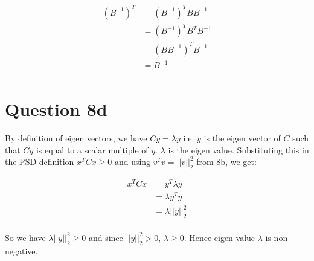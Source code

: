 \documentclass{article}
\begin{document}
    \begin{align*}
        (B^{-1})^T  &= (B^{-1})^TBB^{-1} \\
                    &= (B^{-1})^TB^TB^{-1} \\
                    &= (BB^{-1})^TB^{-1} \\
                    &= B^{-1} \\
    \end{align*}

    \section*{Question 8d}
    By definition of eigen vectors, we have $Cy = \lambda y$ i.e. $y$ is the eigen vector of $C$ such that $Cy$ is equal to a scalar multiple of $y$. $\lambda$ is the eigen value. Substituting this in the PSD definition $x^TCx \ge 0$ and using $v^Tv = ||v||_2^2$ from 8b, we get:

    \begin{align*}
        x^TCx   &= y^T\lambda y \\
                &= \lambda y^Ty \\
                &= \lambda ||y||_2^2 \\
    \end{align*}

    So we have $\lambda ||y||_2^2 \ge 0$ and since $||y||_2^2 > 0$, $\lambda \ge 0$. Hence eigen value $\lambda$ is non-negative.
\end{document}
